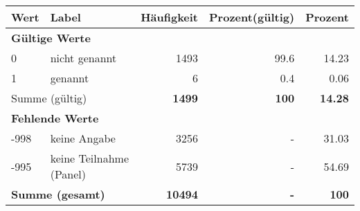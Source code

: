      \begin{longtable}{lXrrr}
     \toprule
     \textbf{Wert} & \textbf{Label} & \textbf{Häufigkeit} & \textbf{Prozent(gültig)} & \textbf{Prozent} \\
     \endhead
     \midrule
     \multicolumn{5}{l}{\textbf{Gültige Werte}}\\

     0 &
     \multicolumn{1}{X}{ nicht genannt   } &


       \num{1493} &
       \num[round-mode=places,round-precision=2]{99,6} &
         \num[round-mode=places,round-precision=2]{14,23} \\

     1 &
     \multicolumn{1}{X}{ genannt   } &


       \num{6} &
       \num[round-mode=places,round-precision=2]{0,4} &
         \num[round-mode=places,round-precision=2]{0,06} \\
     \midrule
     \multicolumn{2}{l}{Summe (gültig)} &
       \textbf{\num{1499}} &
     \textbf{100} &
       \textbf{\num[round-mode=places,round-precision=2]{14,28}} \\
     \multicolumn{5}{l}{\textbf{Fehlende Werte}}\\
       -998 &
       keine Angabe &
         \num{3256} &
        - &
         \num[round-mode=places,round-precision=2]{31,03} \\
       -995 &
       keine Teilnahme (Panel) &
         \num{5739} &
        - &
         \num[round-mode=places,round-precision=2]{54,69} \\
     \midrule
     \multicolumn{2}{l}{\textbf{Summe (gesamt)}} &
          \textbf{\num{10494}} &
        \textbf{-} &
        \textbf{100} \\
     \bottomrule
     \end{longtable}
     
